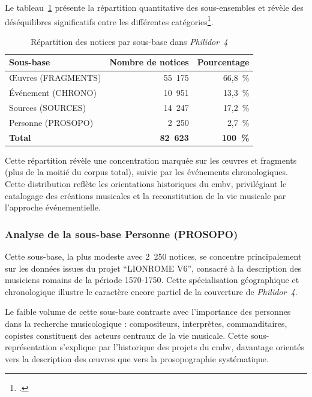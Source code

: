 Le tableau~\ref{tab:repartition_sousbases} présente la répartition quantitative des sous-ensembles et révèle des déséquilibres significatifs entre les différentes catégories\footcite{BaseDonneesPHILIDOR42024}.

\begin{table}[htbp]
	\centering
	\caption{Répartition des notices par sous-base dans \textit{Philidor~4}}
	\label{tab:repartition_sousbases}
	\begin{tabular}{lrr}
		\toprule
		\textbf{Sous-base} & \textbf{Nombre de notices} & \textbf{Pourcentage} \\
		\midrule
		Œuvres (FRAGMENTS) & 55~175 & 66,8~\% \\
		Événement (CHRONO) & 10~951 & 13,3~\% \\
		Sources (SOURCES) & 14~247 & 17,2~\% \\
		Personne (PROSOPO) & 2~250 & 2,7~\% \\
		\midrule
		\textbf{Total} & \textbf{82~623} & \textbf{100~\%} \\
		\bottomrule
	\end{tabular}
\end{table}

Cette répartition révèle une concentration marquée sur les œuvres et fragments (plus de la moitié du corpus total), suivie par les événements chronologiques. Cette distribution reflète les orientations historiques du \gls{cmbv}, privilégiant le catalogage des créations musicales et la reconstitution de la vie musicale par l'approche événementielle.

\subsubsection{Analyse de la sous-base Personne (PROSOPO)}

Cette sous-base, la plus modeste avec 2~250 notices, se concentre principalement sur les données issues du projet \enquote{LIONROME V6}, consacré à la description des musiciens romains de la période 1570-1750. Cette spécialisation géographique et chronologique illustre le caractère encore partiel de la couverture  de \textit{Philidor~4}.

Le faible volume de cette sous-base contraste avec l'importance des personnes dans la recherche musicologique : compositeurs, interprètes, commanditaires, copistes constituent des acteurs centraux de la vie musicale. Cette sous-représentation s'explique par l'historique des projets du \gls{cmbv}, davantage orientés vers la description des œuvres que vers la prosopographie systématique.

